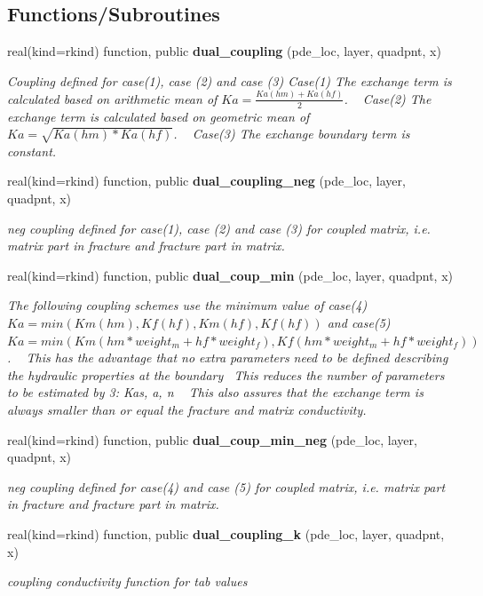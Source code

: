 \subsection*{Functions/\+Subroutines}
\begin{DoxyCompactItemize}
\item 
real(kind=rkind) function, public {\bf dual\+\_\+coupling} (pde\+\_\+loc, layer, quadpnt, x)
\begin{DoxyCompactList}\small\item\em Coupling defined for case(1), case (2) and case (3) Case(1) The exchange term is calculated based on arithmetic mean of $Ka=\frac{Ka(hm)+Ka(hf)}{2}$. ~\newline
 Case(2) The exchange term is calculated based on geometric mean of $Ka=\sqrt{Ka(hm)*Ka(hf)}$. ~\newline
 Case(3) The exchange boundary term is constant.~\newline
 \end{DoxyCompactList}\item 
real(kind=rkind) function, public {\bf dual\+\_\+coupling\+\_\+neg} (pde\+\_\+loc, layer, quadpnt, x)
\begin{DoxyCompactList}\small\item\em neg coupling defined for case(1), case (2) and case (3) for coupled matrix, i.\+e. matrix part in fracture and fracture part in matrix. \end{DoxyCompactList}\item 
real(kind=rkind) function, public {\bf dual\+\_\+coup\+\_\+min} (pde\+\_\+loc, layer, quadpnt, x)
\begin{DoxyCompactList}\small\item\em The following coupling schemes use the minimum value of case(4) $Ka=min(Km(hm),Kf(hf),Km(hf),Kf(hf))$ and case(5) $Ka=min(Km(hm*weight_m+hf*weight_f),Kf(hm*weight_m+hf*weight_f))$. ~\newline
 This has the advantage that no extra parameters need to be defined describing the hydraulic properties at the boundary~\newline
 This reduces the number of parameters to be estimated by 3\+: Kas, a, n ~\newline
 This also assures that the exchange term is always smaller than or equal the fracture and matrix conductivity. \end{DoxyCompactList}\item 
real(kind=rkind) function, public {\bf dual\+\_\+coup\+\_\+min\+\_\+neg} (pde\+\_\+loc, layer, quadpnt, x)
\begin{DoxyCompactList}\small\item\em neg coupling defined for case(4) and case (5) for coupled matrix, i.\+e. matrix part in fracture and fracture part in matrix. \end{DoxyCompactList}\item 
real(kind=rkind) function, public {\bf dual\+\_\+coupling\+\_\+k} (pde\+\_\+loc, layer, quadpnt, x)
\begin{DoxyCompactList}\small\item\em coupling conductivity function for tab values \end{DoxyCompactList}\end{DoxyCompactItemize}


